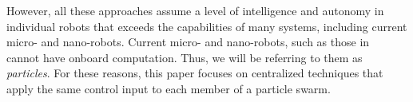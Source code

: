 However, all these approaches assume a level of intelligence and autonomy in individual robots that exceeds the capabilities of many systems, including current micro- and nano-robots.  Current micro- and nano-robots, such as those in~\cite{Chowdhury2015,martel2015magnetotactic,Xiaohui2015magnetiteMicroswimmers} cannot have onboard computation. Thus, we will be referring to them as {\em particles}. For these reasons, this paper focuses on centralized techniques that apply the same control input to each member of a particle swarm.%


